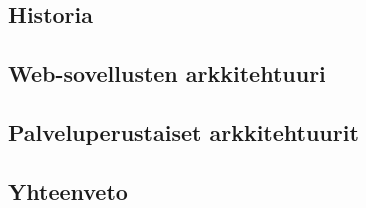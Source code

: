 
\subsection{Historia}

\subsection{Web-sovellusten arkkitehtuuri}

\subsection{Palveluperustaiset arkkitehtuurit}

\subsection{Yhteenveto}

